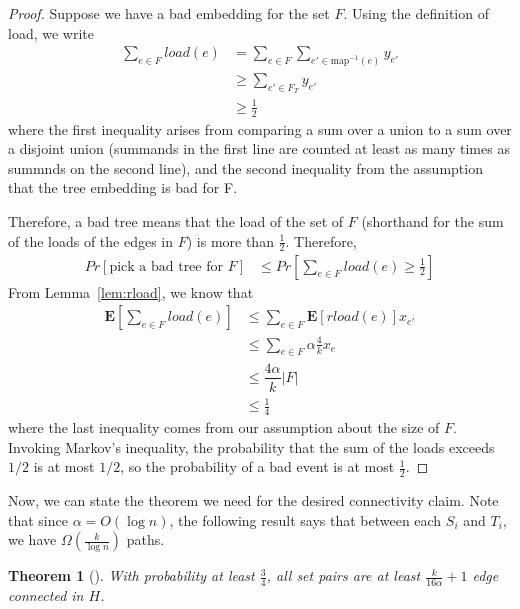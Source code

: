 \documentclass[12pt]{article}
\newtheorem{theorem}{Theorem}
\begin{document}
\begin{proof}
Suppose we have a bad embedding for the set $F$. Using the definition of load, we write
\begin{align}
\sum_{e \in F} load(e)&= \sum_{e \in F} \sum_{e' \in \text{map}^{-1}(e)} y_{e'} \\
                    &\geq \sum_{e' \in F_T} y_{e'} \\
                    &\geq \frac{1}{2}
\end{align}
where the first inequality arises from comparing a sum over a union to a sum over a disjoint union (summands in the first line are counted at least as many times as summnds on the second line), and the second inequality from the assumption that the tree embedding is bad for F.

Therefore, a bad tree means that the load of the set of $F$ (shorthand for the sum of the loads of the edges in $F$) is more than $\frac{1}{2}$. Therefore,
\begin{align}
Pr[\text{pick a bad tree for $F$}] &\leq Pr[ \sum_{e\in F} load(e) \geq \frac{1}{2}]
\end{align}
From Lemma~\ref{lem:rload}, we know that
\begin{align}
\textbf{E}[ \sum_{e \in F} load(e) ] &\leq \sum_{e \in F} \textbf{E}[rload(e)]x_{e'} \\
                                   & \leq \sum_{e\in F} \alpha \frac{4}{k} x_{e} \\
                                   & \leq \dfrac{4\alpha}{k} |F| \\
                                   &\leq \frac{1}{4}
\end{align}
where the last inequality comes from our assumption about the size of $F$. Invoking Markov's inequality, the probability that the sum of the loads exceeds $1/2$ is at most $1/2$, so the probability of a bad event is at most $\frac{1}{2}$. 
\end{proof}

Now, we can state the theorem we need for the desired connectivity claim. Note that since $\alpha = O(\log n)$, the following result says that between each $S_i$ and $T_i$, we have $\Omega(\frac{k}{\log n})$ paths.

\begin{theorem}[\cite{ssc}]
\label{theorem:connected}
With probability at least $\frac{3}{4}$, all set pairs are at least $\frac{k}{16\alpha} + 1$ edge connected in $H$. 
\end{theorem}
\end{document}
